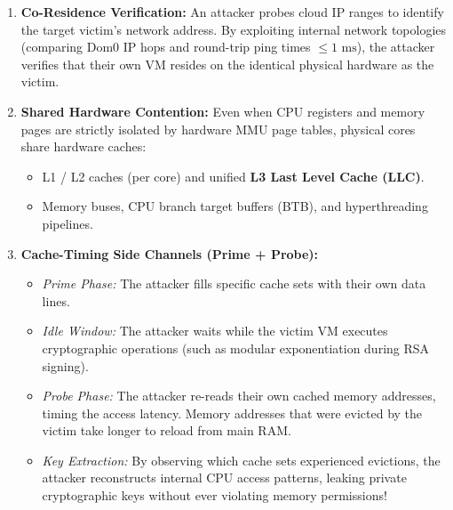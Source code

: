 \begin{enumerate}[leftmargin=*]
  \item \textbf{Co-Residence Verification:} An attacker probes cloud IP ranges to identify the target victim's network address. By exploiting internal network topologies (comparing Dom0 IP hops and round-trip ping times $\le 1\text{ ms}$), the attacker verifies that their own VM resides on the identical physical hardware as the victim.
  \item \textbf{Shared Hardware Contention:} Even when CPU registers and memory pages are strictly isolated by hardware MMU page tables, physical cores share hardware caches:
    \begin{itemize}
      \item L1 / L2 caches (per core) and unified \textbf{L3 Last Level Cache (LLC)}.
      \item Memory buses, CPU branch target buffers (BTB), and hyperthreading pipelines.
    \end{itemize}
  \item \textbf{Cache-Timing Side Channels (Prime + Probe):}
    \begin{itemize}
      \item \emph{Prime Phase:} The attacker fills specific cache sets with their own data lines.
      \item \emph{Idle Window:} The attacker waits while the victim VM executes cryptographic operations (such as modular exponentiation during RSA signing).
      \item \emph{Probe Phase:} The attacker re-reads their own cached memory addresses, timing the access latency. Memory addresses that were evicted by the victim take longer to reload from main RAM.
      \item \emph{Key Extraction:} By observing which cache sets experienced evictions, the attacker reconstructs internal CPU access patterns, leaking private cryptographic keys without ever violating memory permissions!
    \end{itemize}
\end{enumerate}

